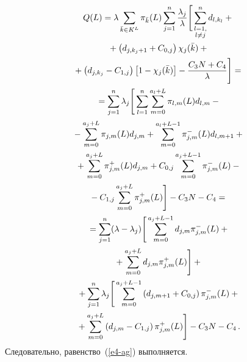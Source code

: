 \begin{multicols}{2}
  \vspace*{-3pt}
  
  \noindent
  \begin{multline*}
  Q(L)= \lambda\sum\limits_{\bar{k}\in K^L} \pi_{\bar{k}} (L) 
\sum\limits^n_{j=1} \displaystyle\frac{\displaystyle \lambda_j\mathstrut}{\displaystyle \lambda\mathstrut} \Bigg[ \sum\limits^n_{{\substack{{l=1,}\\ {l\not=j}}}} 
d_{l,k_l} +{}\\[1pt]
{}+\left( d_{j,k_j+1} +C_{0,j}\right) \chi_j(\bar{k})+{}\\[1pt]
  {}+ \left( d_{j,k_j} -C_{1,j}\right) \left[1-\chi_j (\bar{k})\right] -\displaystyle\frac{\displaystyle C_3 N+C_4\mathstrut}{\displaystyle \lambda\mathstrut}\Bigg] ={}\\[1pt]
   {}=
  \sum\limits^n_{j=1} \lambda_j \Bigg[ \sum\limits^n_{l=1} 
\sum\limits_{m=0}^{a_l+L} \pi_{l,m}(L) d_{l,m} -{}\\[1pt]
{}- \sum\limits_{m=0}^{a_j+L} \pi_{j,m}(L) d_{j,m} +\sum\limits_{m=0}^{a_l+L-1} \pi^-_{j,m}(L) d_{l,m+1}+{}\\[1pt]
{}+
  \sum\limits_{m=0}^{a_j+L} \pi^+_{j,m}(L) d_{j,m} +C_{0,j} 
\sum\limits_{m=0}^{a_j+L-1} \pi^-_{j,m}(L) -{}\\[1pt]
{}- C_{1,j}\sum\limits_{m=0}^{a_j+L} \pi^+_{j,m}(L) \Bigg] -C_3 N-C_4={}
\\[1pt]
     {}=
  \sum\limits^n_{j=1} (\lambda -\lambda_j) \Bigg[ \sum\limits_{m=0}^{a_j+L-1} 
d_{j,m} \pi^-_{j,m}(L) +{}\\[1pt]
{}+ \sum\limits_{m=0}^{a_j+L} d_{j,m} \pi^+_{j,m}(L)\Bigg]+{}\\[1pt]
  {}+
  \sum\limits_{j=1}^n \lambda_j \Bigg[ \sum\limits_{m=0}^{a_j+L-1} \left( 
d_{j,m+1} +C_{0,j}\right) \pi^-_{j,m}(L) +{}\\[1pt]
{}+
\sum\limits_{m=0}^{a_j+L} \left( 
d_{j,m}-C_{1,j}\right) \pi^+_{j,m}(L) \Bigg]-C_3N -C_4 \,.
  \end{multline*}
Следовательно, равенство~(\ref{e4-ag}) вы\-пол\-ня\-ется.


\end{multicols}
